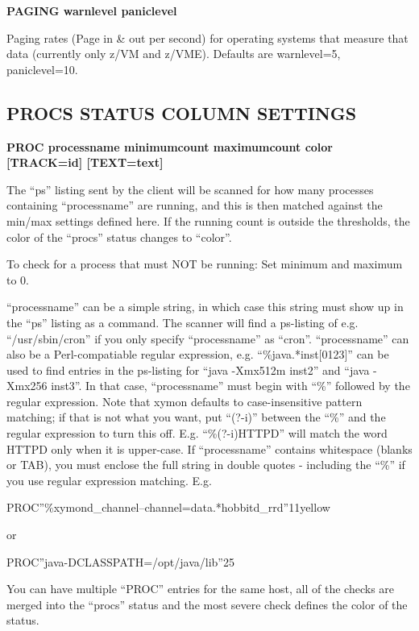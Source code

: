  


 \textbf{PAGING warnlevel paniclevel}



  Paging rates (Page in \& out per second) for operating systems that measure that data (currently only z/VM and z/VME). Defaults are warnlevel=5, paniclevel=10. 


 
\subsection{PROCS STATUS COLUMN SETTINGS}


 \textbf{PROC processname minimumcount maximumcount color [TRACK=id] [TEXT=text]}



  The ``ps'' listing sent by the client will be scanned for how many processes containing ``processname'' are running, and this is then matched against the min/max settings defined here. If the running count is outside the thresholds, the color of the ``procs'' status changes to ``color''. 


  To check for a process that must NOT be running: Set minimum and maximum to 0. 


  ``processname'' can be a simple string, in which case this string must show up in the ``ps'' listing as a command. The scanner will find a ps-listing of e.g. ``/usr/sbin/cron'' if you only specify ``processname'' as ``cron''. ``processname'' can also be a Perl-compatiable regular expression, e.g. ``\%java.*inst[0123]'' can be used to find entries in the ps-listing for ``java -Xmx512m inst2'' and ``java -Xmx256 inst3''. In that case, ``processname'' must begin with ``\%'' followed by the regular expression. Note that xymon defaults to case-insensitive pattern matching; if that is not what you want, put ``(?-i)'' between the ``\%'' and the regular expression to turn this off. E.g. ``\%(?-i)HTTPD'' will match the word HTTPD only when it is upper-case.  
 If ``processname'' contains whitespace (blanks or TAB), you must enclose the full string in double quotes - including the ``\%'' if you use regular expression matching. E.g. 


  
PROC''\%xymond\_channel--channel=data.*hobbitd\_rrd''11yellow 


  or 


  
PROC''java-DCLASSPATH=/opt/java/lib''25 


  You can have multiple ``PROC'' entries for the same host, all of the checks are merged into the ``procs'' status and the most severe check defines the color of the status. 


